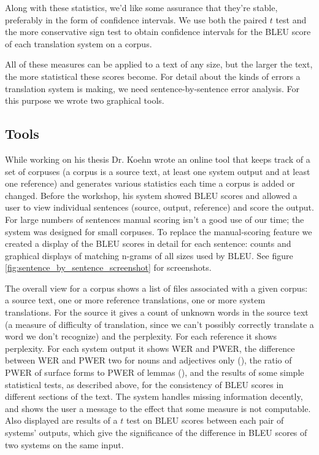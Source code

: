 \documentclass[11pt]{report}
\theoremstyle{plain}
\begin{document}
{Along with these statistics, we'd like some assurance that they're stable, preferably in the form of confidence intervals. We use both the paired $t$ test and the more conservative sign test to obtain confidence intervals for the BLEU score of each translation system on a corpus.

All of these measures can be applied to a text of any size, but the larger the text, the more statistical these scores become. For detail about the kinds of errors a translation system is making, we need sentence-by-sentence error analysis. For this purpose we wrote two graphical tools.

\subsection{Tools}
While working on his thesis Dr. Koehn wrote an online tool that keeps track of a set of corpuses (a corpus is a source text, at least one system output and at least one reference) and generates various statistics each time a corpus is added or changed. Before the workshop, his system showed BLEU scores and allowed a user to view individual sentences (source, output, reference) and score the output. For large numbers of sentences manual scoring isn't a good use of our time; the system was designed for small corpuses. To replace the manual-scoring feature we created a display of the BLEU scores in detail for each sentence: counts and graphical displays of matching n-grams of all sizes used by BLEU. See figure \ref{fig:sentence_by_sentence_screenshot} for screenshots.

The overall view for a corpus shows a list of files associated with a given corpus: a source text, one or more reference translations, one or more system translations. For the source it gives a count of unknown words in the source text (a measure of difficulty of translation, since we can't possibly correctly translate a word we don't recognize) and the perplexity. For each reference it shows perplexity. For each system output it shows WER and PWER, the difference between WER and PWER two for nouns and adjectives only (\cite{errMeasures}), the ratio of PWER of surface forms to PWER of lemmas (\cite{errMeasures}), and the results of some simple statistical tests, as described above, for the consistency of BLEU scores in different sections of the text. The system handles missing information decently, and shows the user a message to the effect that some measure is not computable. Also displayed are results of a $t$ test on BLEU scores between each pair of systems' outputs, which give the significance of the difference in BLEU scores of two systems on the same input.

}
\end{document}
